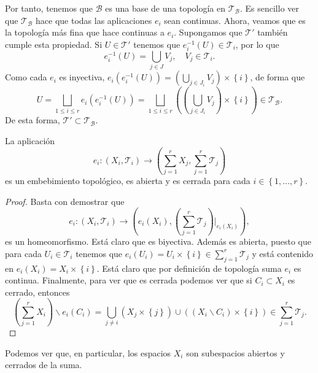 Por tanto, tenemos que $\displaystyle \mathcal{B} $ es una base de una topología en $\displaystyle \mathcal{T}_{\mathcal{B}} $. Es sencillo ver que $\displaystyle \mathcal{T}_{\mathcal{B}} $ hace que todas las aplicaciones $\displaystyle e_{i} $ sean continuas. Ahora, veamos que es la topología más fina que hace continuas a $\displaystyle e_{i} $. Supongamos que $\displaystyle \mathcal{T}' $ también cumple esta propiedad. Si $\displaystyle U \in \mathcal{T}' $ tenemos que $\displaystyle e_{i}^{-1}\left(U\right)\in \mathcal{T}_{i} $, por lo que 
\[e^{-1}_{i} \left(U\right)=\bigcup_{j \in J}V_{j}, \quad V_{j} \in \mathcal{T}_{i}.\]
Como cada $\displaystyle e_{i} $ es inyectiva, $\displaystyle e_{i}\left(e_{i}^{-1}\left(U\right)\right)= \left(\bigcup_{j \in J_{i}}V_{j}\right) \times \left\{ i\right\} $, de forma que 
\[U = \bigsqcup_{1 \leq i \leq r}e_{i}\left(e^{-1}_{i}\left(U\right)\right) =\bigsqcup_{1 \leq i \leq r} \left(\left(\bigcup_{j \in J_{i}}V_{j}\right) \times \left\{ i\right\}\right) \in \mathcal{T}_{\mathcal{B}}.\]
De esta forma, $\displaystyle \mathcal{T}'\subset\mathcal{T}_{\mathcal{B}} $. 
\begin{prop}
	La aplicación 
	\[e_{i} : \left(X_{i}, \mathcal{T}_{i}\right)\to \left(\sum^{r}_{j = 1}X_{j}, \sum^{r}_{j = 1}\mathcal{T}_{j}\right) \]
	es un embebimiento topológico, es abierta y es cerrada para cada $\displaystyle i \in \left\{ 1, \ldots, r\right\}  $. 
\end{prop}
\begin{proof}
Basta con demostrar que 
\[e_{i} : \left(X_{i}, \mathcal{T}_{i}\right)\to \left(e_{i}\left(X_{i}\right), \left(\sum^{r}_{j = 1}\mathcal{T}_{j}\right)|_{e_{i}\left(X_{i}\right)}\right) ,\]
es un homeomorfismo. Está claro que es biyectiva. Además es abierta, puesto que para cada $\displaystyle U_{i} \in \mathcal{T}_{i} $ tenemos que $\displaystyle e_{i}\left(U_{i}\right)=U_{i} \times \left\{ i\right\} \in \sum^{r}_{j = 1}\mathcal{T}_{j} $ y está contenido en $\displaystyle e_{i}\left(X_{i}\right)=X_{i} \times \left\{ i\right\}  $. Está claro que por definición de topología suma $\displaystyle e_{i} $ es continua. Finalmente, para ver que es cerrada podemos ver que si $\displaystyle C_{i} \subset X_{i} $ es cerrado, entonces
\[\left(\sum^{r}_{j=1}X_{i}\right)\backslash e_{i}\left(C_{i}\right)=\bigcup_{j \neq i}\left(X_{j} \times \left\{ j\right\} \right) \cup \left(\left(X_{i}\backslash C_{i}\right)\times \left\{ i\right\} \right)\in \sum^{r}_{j = 1}\mathcal{T}_{j} .\]
\end{proof}
\begin{observation}
Podemos ver que, en particular, los espacios $\displaystyle X_{i} $ son subespacios abiertos y cerrados de la suma. 
\end{observation}
